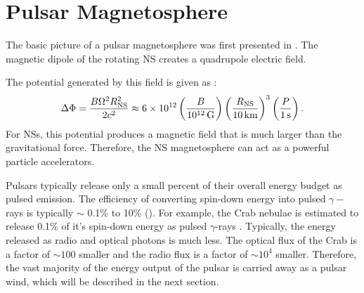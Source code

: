 \section{Pulsar Magnetosphere}

The basic picture of a pulsar magnetosphere was first presented in
\cite{goldreich_1969_pulsar-electrodynamics}.  The magnetic dipole of
the rotating \ac{NS} creates a quadrupole electric field.

The potential generated by this field is given as
\citep{goldreich_1969_pulsar-electrodynamics}:
\begin{equation}
  \Delta \Phi = \frac{B \Omega^2 R_\text{NS}^2}{2c^2}
  \approx 6\times 10^{12} 
  \left(\frac{B}{10^{12}\,\text{G}}\right)
  \left(\frac{R_\text{NS}}{10\,\text{km}}\right)^3
  \left(\frac{P}{1\,\text{s}}\right).
\end{equation}
For \acp{NS}, this potential produces a magnetic field that is much larger
than the gravitational force. Therefore, the \ac{NS} magnetosphere can
act as a powerful particle accelerators.

Pulsars typically release only a small percent of their overall
energy budget as pulsed emission. The efficiency of converting
spin-down energy into pulsed $\gamma-$rays is typically $\sim$
0.1\% to 10\% (\cite{abdo_2010a_first-fermi}).  For example, the
Crab nebulae is estimated to release 0.1\% of it's spin-down energy
as pulsed $\gamma$-rays \cite{abdo_2010a_fermi-large}.  Typically,
the energy released as radio and optical photons is much less.
The optical flux of the Crab is a factor of $\sim100$ smaller
\cite{cocke_1969_discovery-optical} and the radio flux is a factor of
$\sim 10^4$ smaller.  Therefore, the vast majority of the energy output
of the pulsar is carried away as a pulsar wind, which will be described
in the next section.

